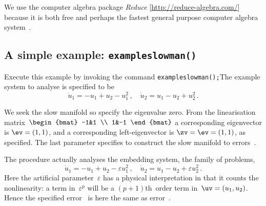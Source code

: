 \documentclass[11pt,a5paper]{article}
\def\eps{\varepsilon}
\begin{document}
We use the computer algebra package \emph{Reduce} 
[\url{http://reduce-algebra.com/}] because it is both free 
and perhaps the fastest general purpose computer algebra 
system~\cite[e.g.]{Fateman2002}.



\subsection{A simple example: \texttt{exampleslowman()}} 
\label{ss:eg}
Execute this example by invoking the command
\verb|exampleslowman();|\quad The example system to analyse
is specified to be \cite[Example~2.1]{Roberts2014a}
\begin{equation*}
\dot u_1=-u_1+u_2-u_1^2\,, \quad \dot u_2=u_1-u_2+u_2^2\,.
\end{equation*}
We seek the slow manifold so specify the eigenvalue zero.
From the linearisation matrix~\(\begin{bmat} -1&1 \\ 1&-1
\end{bmat}\) a corresponding eigenvector is \(\ev=(1,1)\),
and a corresponding left-eigenvector is \(\zv=\ev=(1,1)\),
as specified. The last parameter specifies to construct the
slow manifold to errors~\Ord{\eps^5}.

The procedure actually analyses the embedding system, the
family of problems,
\begin{equation*}
\dot u_1=-u_1+u_2-\eps u_1^2\,, \quad 
\dot u_2=u_1-u_2+\eps u_2^2\,.
\end{equation*}
Here the artificial parameter~\(\eps\) has a physical
interpretation in that it counts the nonlinearity: a term
in~\(\eps^p\) will be a \((p+1)\)th~order term
in~\(\uv=(u_1,u_2)\). Hence the specified error~\Ord{\eps^5}
is here the same as error~.
\end{document}
